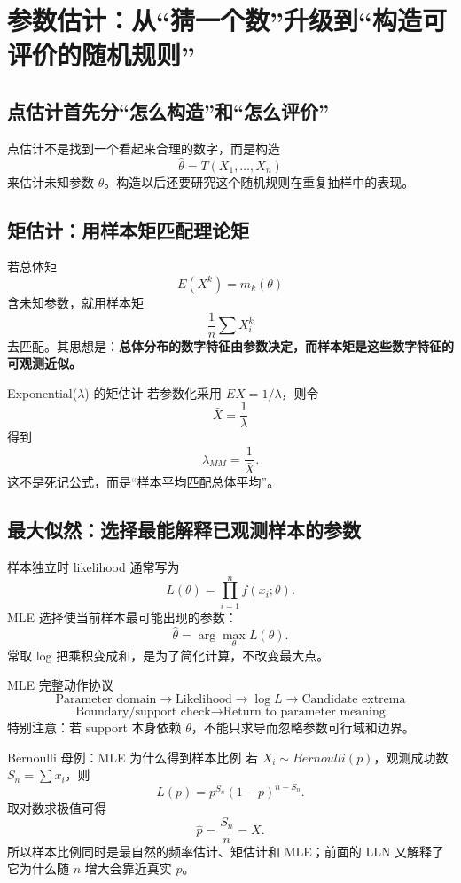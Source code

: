 \documentclass[11pt,a4paper,openany]{ctexbook}
\newcommand{\key}[1]{\textbf{\color{deep}#1}}
\begin{document}
\chapter{参数估计：从“猜一个数”升级到“构造可评价的随机规则”}

\section{点估计首先分“怎么构造”和“怎么评价”}
点估计不是找到一个看起来合理的数字，而是构造
\[
\hat\theta=T(X_1,\dots,X_n)
\]
来估计未知参数 $\theta$。构造以后还要研究这个随机规则在重复抽样中的表现。

\section{矩估计：用样本矩匹配理论矩}
若总体矩
\[
E(X^k)=m_k(\theta)
\]
含未知参数，就用样本矩
\[
\frac1n\sum X_i^k
\]
去匹配。其思想是：\key{总体分布的数字特征由参数决定，而样本矩是这些数字特征的可观测近似。}

\begin{examplebox}{Exponential($\lambda$) 的矩估计}
若参数化采用 $EX=1/\lambda$，则令
\[
\bar X=\frac1\lambda
\]
得到
\[
\hat\lambda_{MM}=\frac1{\bar X}.
\]
这不是死记公式，而是“样本平均匹配总体平均”。
\end{examplebox}

\section{最大似然：选择最能解释已观测样本的参数}
样本独立时 likelihood 通常写为
\[
L(\theta)=\prod_{i=1}^nf(x_i;\theta).
\]
MLE 选择使当前样本最可能出现的参数：
\[
\hat\theta=\arg\max_\theta L(\theta).
\]
常取 log 把乘积变成和，是为了简化计算，不改变最大点。

\begin{methodbox}{MLE 完整动作协议}
\[
\boxed{\text{Parameter domain}\to\text{Likelihood}\to\log L\to\text{Candidate extrema}}
\]
\[
\boxed{\text{Boundary/support check}\to\text{Return to parameter meaning}}
\]
特别注意：若 support 本身依赖 $\theta$，不能只求导而忽略参数可行域和边界。
\end{methodbox}

\begin{examplebox}{Bernoulli 母例：MLE 为什么得到样本比例}
若 $X_i\sim Bernoulli(p)$，观测成功数 $S_n=\sum x_i$，则
\[
L(p)=p^{S_n}(1-p)^{n-S_n}.
\]
取对数求极值可得
\[
\hat p=\frac{S_n}{n}=\bar X.
\]
所以样本比例同时是最自然的频率估计、矩估计和 MLE；前面的 LLN 又解释了它为什么随 $n$ 增大会靠近真实 $p$。
\end{examplebox}
\end{document}
